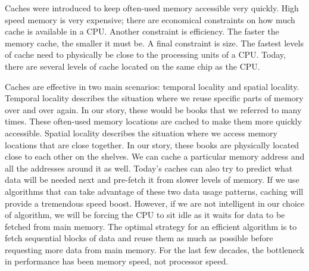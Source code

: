 Caches were introduced to keep often-used memory accessible very quickly.  High speed memory is very expensive; there are economical constraints on how much cache is available in a CPU.
Another constraint is efficiency.  The faster the memory cache, the smaller it must be.
A final constraint is size.  The fastest levels of cache need to physically be close to the processing units of a CPU.
Today, there are several levels of cache located on the same chip as the CPU.

Caches are effective in two main scenarios: temporal locality and spatial locality.
Temporal locality describes the situation where we reuse specific parts of memory over and over again.
In our story, these would be books that we referred to many times.
These often-used memory locations are cached to make them more quickly accessible.
Spatial locality describes the situation where we access memory locations that are close together.
In our story, these books are physically located close to each other on the shelves.
We can cache a particular memory address and all the addresses around it as well.
Today's caches can also try to predict what data will be needed next and pre-fetch it from slower levels of memory.
If we use algorithms that can take advantage of these two data usage patterns, caching will provide a tremendous speed boost.
However, if we are not intelligent in our choice of algorithm, we will be forcing the CPU to sit idle as it waits for data to be fetched from main memory.
The optimal strategy for an efficient algorithm is to fetch sequential blocks of data and reuse them as much as possible before requesting more data from main memory.
For the last few decades, the bottleneck in performance has been memory speed, not processor speed.

